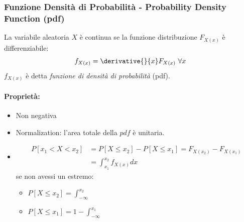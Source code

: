         \subsubsection{Funzione Densità di Probabilità - Probability Density Function (pdf)}
            La variabile aleatoria $X$ è continua se la funzione distribuzione $F_{X(x)}$ è differenziabile:
            \[
                f_{X(x)} = \derivative{}{x}F_{X(x)}\ \forall x    
            \]
            $f_{X(x)}$ è detta \emph{funzione di densità di probabilità} (pdf).
            \paragraph{Proprietà:}
                \begin{itemize}
                    \item {Non negativa}
                    \item {Normalization: l'area totale della $pdf$ è unitaria.}
                    \item {
                        \begin{align}
                            P[x_1<X<x_2] &= P[X\leq x_2]  - P[X\leq x_1] = F_{X(x_2)} - F_{X(x_1)}  \nonumber \\
                                         &= \int_{x_1}^{x_2} f_{X(x)} dx\nonumber
                        \end{align}
                        se non avessi un estremo:
                        \begin{itemize}
                            \item {$ P[X\leq x_2] = \int_{-\infty}^{x_2}$}
                            \item {$ P[X\leq x_1] = 1-\int_{-\infty}^{x_1}$}
                        \end{itemize}
                    }
                \end{itemize}
